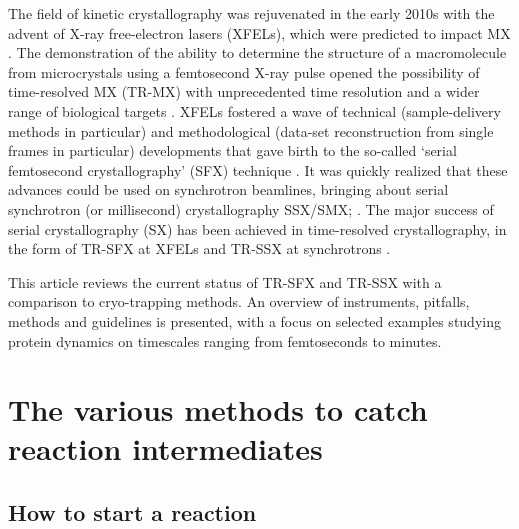 The field of kinetic crystallography was rejuvenated in the early 2010s with the advent of X-ray free-electron lasers (XFELs), which were predicted to impact MX \parencite{neutzePotentialBiomolecularImaging2000}. The demonstration of the ability to determine the structure of a macromolecule from microcrystals using a femtosecond X-ray pulse opened the possibility of time-resolved MX (TR-MX) with unprecedented time resolution and a wider range of biological targets \parencite{chapmanFemtosecondXrayProtein2011}. XFELs fostered a wave of technical (sample-delivery methods in particular) and methodological (data-set reconstruction from single frames in particular) developments that gave birth to the so-called ‘serial femtosecond crystallography’ (SFX) technique \parencite{schlichtingSerialFemtosecondCrystallography2015}. It was quickly realized that these advances could be used on synchrotron beamlines, bringing about serial synchrotron (or millisecond) crystallography SSX/SMX; \parencite{noglyLipidicCubicPhase2015}. The major success of serial crystallography (SX) has been achieved in time-resolved crystallography, in the form of TR-SFX at XFELs \parencite{orvilleRecentResultsTime2020} and TR-SSX at synchrotrons \parencite{pearsonSerialSynchrotronCrystallography2020}.

This article reviews the current status of TR-SFX and TR-SSX with a comparison to cryo-trapping methods. An overview of instruments, pitfalls, methods and guidelines is presented, with a focus on selected examples studying protein dynamics on timescales ranging from femtoseconds to minutes.

\section{The various methods to catch reaction intermediates}

\subsection{How to start a reaction}\label{sec:howtostart}

